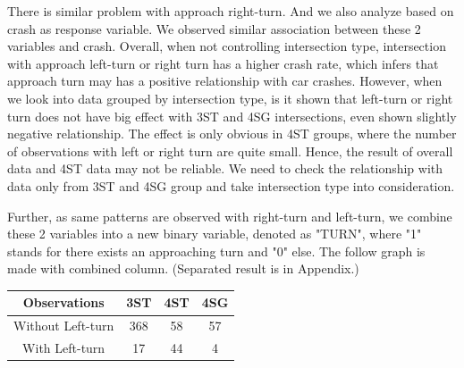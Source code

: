 \documentclass[11pt]{scrartcl} %
\begin{document}
There is similar problem with approach right-turn. And we also analyze based on crash as response variable. We observed similar association between these 2 variables and crash. Overall, when not controlling intersection type, intersection with approach left-turn or right turn has a higher crash rate, which infers that approach turn may has a positive relationship with car crashes. However, when we look into data grouped by intersection type, is it shown that left-turn or right turn does not have big effect with 3ST and 4SG intersections, even shown slightly negative relationship. The effect is only obvious in 4ST groups, where the number of observations with left or right turn are quite small. Hence, the result of overall data and 4ST data may not be reliable. We need to check the relationship with data only from 3ST and 4SG group and take intersection type into consideration.

Further, as same patterns are observed with right-turn and left-turn, we combine these 2 variables into a new binary variable, denoted as "TURN", where "1" stands for there exists an approaching turn and "0" else. The follow graph is made with combined column. (Separated result is in Appendix.)

\begin{table}[H]
\begin{tabular}{|c|c|c|c|}
\hline
Observations      & 3ST & 4ST & 4SG \\
\hline
Without Left-turn & 368 & 58  & 57  \\
\hline
With Left-turn    & 17  & 44  & 4   \\
\hline
\end{tabular}
\end{table}
\end{document}
